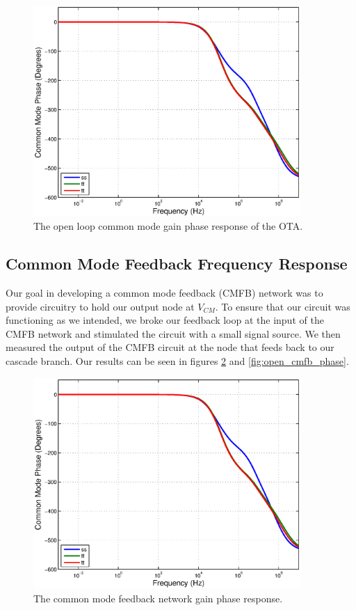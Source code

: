 \documentclass[journal]{IEEEtran}
\begin{document}
\begin{figure}
\centering
\includegraphics[width=4in]{Plots/open_cm_phase.eps}
\caption{The open loop common mode gain phase response of the OTA.}
\label{fig:open_cm_phase}
\end{figure}

\subsection{Common Mode Feedback Frequency Response}
Our goal in developing a common mode feedback (CMFB) network was to provide circuitry to hold our output node at $V_{CM}$. To ensure that our circuit was functioning as we intended, we broke our feedback loop at the input of the CMFB network and stimulated the circuit with a small signal source. We then measured the output of the CMFB circuit at the node that feeds back to our cascade branch. Our results can be seen in figures \ref{fig:open_cmfb_gain} and \ref{fig:open_cmfb_phase}.

\begin{figure}
\centering
\includegraphics[width=4in]{Plots/open_cm_phase.eps}
\caption{The common mode feedback network gain phase response.}
\label{fig:open_cmfb_gain}
\end{figure}
\end{document}
